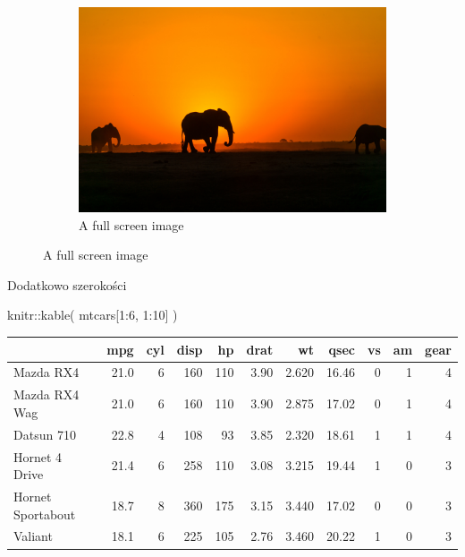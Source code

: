 \documentclass[
  a4paper,
  DIV=11,
  numbers=noendperiod,
  oneside,
  open=any]{scrreprt}
\newenvironment{Shaded}{\begin{snugshade}}{\end{snugshade}}
\newcommand{\DecValTok}[1]{\textcolor[rgb]{0.68,0.00,0.00}{#1}}
\newcommand{\FunctionTok}[1]{\textcolor[rgb]{0.28,0.35,0.67}{#1}}
\newcommand{\NormalTok}[1]{\textcolor[rgb]{0.00,0.23,0.31}{#1}}
\newcommand{\SpecialCharTok}[1]{\textcolor[rgb]{0.37,0.37,0.37}{#1}}
\begin{document}
\begin{figure}%
\begin{figure}[H]

{\centering \includegraphics{elephant.jpg}

}

\caption{A full screen image}

\end{figure}%
\end{figure}%

Dodatkowo szerokości

\begin{Shaded}
\begin{Highlighting}[]
\NormalTok{knitr}\SpecialCharTok{::}\FunctionTok{kable}\NormalTok{(}
\NormalTok{  mtcars[}\DecValTok{1}\SpecialCharTok{:}\DecValTok{6}\NormalTok{, }\DecValTok{1}\SpecialCharTok{:}\DecValTok{10}\NormalTok{]}
\NormalTok{)}
\end{Highlighting}
\end{Shaded}

\begin{table}

\begin{tabular}{lrrrrrrrrrr}
\toprule
 & mpg & cyl & disp & hp & drat & wt & qsec & vs & am & gear\\
\midrule
Mazda RX4 & 21.0 & 6 & 160 & 110 & 3.90 & 2.620 & 16.46 & 0 & 1 & 4\\
Mazda RX4
Wag & 21.0 & 6 & 160 & 110 & 3.90 & 2.875 & 17.02 & 0 & 1 & 4\\
Datsun 710 & 22.8 & 4 & 108 & 93 & 3.85 & 2.320 & 18.61 & 1 & 1 & 4\\
Hornet 4
Drive & 21.4 & 6 & 258 & 110 & 3.08 & 3.215 & 19.44 & 1 & 0 & 3\\
Hornet
Sportabout & 18.7 & 8 & 360 & 175 & 3.15 & 3.440 & 17.02 & 0 & 0 & 3\\
Valiant & 18.1 & 6 & 225 & 105 & 2.76 & 3.460 & 20.22 & 1 & 0 & 3\\
\bottomrule
\end{tabular}

\end{table}%
\end{document}
